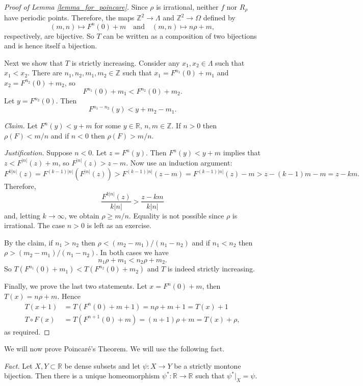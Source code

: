 \documentclass[12pt]{article}
\theoremstyle{definition}
\theoremstyle{remark}
\begin{document}
\begin{proof}[Proof of Lemma \ref{lemma_for_poincare}]
Since $\rho$ is irrational, neither $f$ nor $R_\rho$ have periodic points. Therefore, the maps 
$\mathbb Z^2 \to \Lambda$ and $\mathbb Z^2 \to \Omega$ defined by
\[
(m,n) \mapsto F^n(0) +m \quad \text{and} \quad (m,n) \mapsto n\rho +m,
\]
respectively, are bijective. So $T$ can be written as a composition of two bijections and is hence itself a bijection.

Next we show that $T$ is strictly increasing. Consider any $x_1, x_2 \in \Lambda$ such that 
$x_1 <x_2$.
There are $n_1,n_2,m_1,m_2 \in \mathbb Z$ such that
$x_1 = F^{n_1}(0)+m_1$ and $x_2 = F^{n_2}(0)+m_2$, so
\[
F^{n_1}(0)+m_1 <  F^{n_2}(0)+m_2.
\]
Let $y = F^{n_2}(0)$. Then
\[
F^{n_1-n_2}(y) < y +m_2-m_1.
\]

\smallskip
\noindent
{\it Claim.} Let $F^n(y)<y+m$ for some $y \in \mathbb R$, $n,m \in \mathbb Z$. If $n>0$ then
$\rho(F)<m/n$ and if $n<0$ then $\rho(F)>m/n$.

\smallskip
\noindent
{\it Justification.} Suppose $n<0$. Let $z=F^n(y)$. Then
$F^n(y)<y+m$ implies that $z < F^{|n|}(z)+m$, so
$F^{|n|}(z) >z-m$. Now use an induction argument:
\[
F^{k|n|}(z) =F^{(k-1)|n|}(F^{|n|}(z)) > F^{(k-1)|n|}(z-m)
= F^{(k-1)|n|}(z) -m > z -(k-1)m -m = z-km.
\]
Therefore,
\[
\frac{F^{k|n|}(z)}{k|n|} > \frac{z-km}{k|n|}
\]
and, letting $k \to \infty$, we obtain $\rho \ge m/n$. Equality is not possible since $\rho$ is irrational.
The case $n>0$ is left as an exercise.

\smallskip
By the claim, if $n_1>n_2$ then
$\rho< (m_2-m_1)/(n_1-n_2)$ and if $n_1<n_2$ then 
$\rho>(m_2-m_1)/(n_1-n_2)$. In both cases we have
\[
n_1\rho +m_1 < n_2\rho + m_2.
\]
So $T(F^{n_1}(0)+m_1)< T(F^{n_2}(0)+m_2)$ and $T$ is indeed strictly increasing.

Finally, we prove the last two statements. Let $x=F^n(0)+m$, then $T(x) = n\rho +m$.
Hence
\begin{align*}
T(x+1) &= T(F^n(0)+m+1) = n\rho +m+1 = T(x)+1 \\
T \circ F(x) &= T(F^{n+1}(0)+m) = (n+1)\rho +m = T(x)+\rho,
\end{align*}
as required.
\end{proof}

We will now prove Poincar\'e's Theorem. We will use the following fact.

\medskip
\noindent
{\it Fact.} Let $X,Y \subset \mathbb R$ be dense subsets and let $\psi: X \to Y$ be a strictly 
montone bijection. Then there is a unique homeomorphism
$\psi^* : \mathbb R \to \mathbb R$ such that $\psi^*|_X=\psi$.
\end{document}
